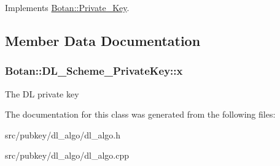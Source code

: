 Implements \hyperlink{classBotan_1_1Private__Key_a26c97282f9c3b32c024dafb77b35cb1e}{Botan\-::\-Private\-\_\-\-Key}.



\subsection{Member Data Documentation}
\hypertarget{classBotan_1_1DL__Scheme__PrivateKey_a74f05875ab03ef8b35468d117e6a65e9}{
\subsubsection[{x}]{ Botan\-::\-D\-L\-\_\-\-Scheme\-\_\-\-Private\-Key\-::x\hspace{0.3cm}{\ttfamily [protected]}}}\label{classBotan_1_1DL__Scheme__PrivateKey_a74f05875ab03ef8b35468d117e6a65e9}
The D\-L private key 

The documentation for this class was generated from the following files\-:\begin{DoxyCompactItemize}
\item 
src/pubkey/dl\-\_\-algo/dl\-\_\-algo.\-h\item 
src/pubkey/dl\-\_\-algo/dl\-\_\-algo.\-cpp\end{DoxyCompactItemize}
